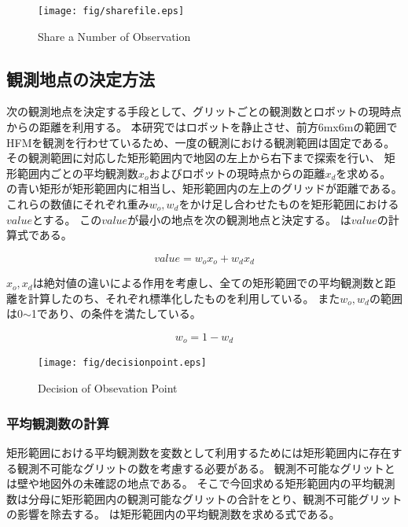 \documentclass{jsarticle}
\begin{document}
\begin{figure}[tbh]
 \centering
  \texttt{[image: fig/sharefile.eps]}
  \vspace*{-4mm}
  \caption{Share a Number of Observation}
  \label{fig: sharefile}
\end{figure}


\subsection{観測地点の決定方法}
\label{decide}
次の観測地点を決定する手段として、グリットごとの観測数とロボットの現時点からの距離を利用する。
本研究ではロボットを静止させ、前方6mx6mの範囲でHFMを観測を行わせているため、一度の観測における観測範囲は固定である。
その観測範囲に対応した矩形範囲内で地図の左上から右下まで探索を行い、
矩形範囲内ごとの平均観測数$x_{o}$およびロボットの現時点からの距離$x_{d}$を求める。
の青い矩形が矩形範囲内に相当し、矩形範囲内の左上のグリッドが距離である。
これらの数値にそれぞれ重み$w_{o},w_{d}$をかけ足し合わせたものを矩形範囲における$value$とする。
この$value$が最小の地点を次の観測地点と決定する。
は$value$の計算式である。

\begin{equation}
  value = w_{o}x_{o} + w_{d}x_{d}
	\label{eqn: value}
\end{equation}

$x_o,x_d$は絶対値の違いによる作用を考慮し、全ての矩形範囲での平均観測数と距離を計算したのち、それぞれ標準化したものを利用している。
また$w_o,w_d$の範囲は0$\sim$1であり、の条件を満たしている。

\begin{equation}
  w_o = 1 - w_d
	\label{eqn: weight}
\end{equation}


\begin{figure}[tbh]
 \centering
  \texttt{[image: fig/decisionpoint.eps]}
  \vspace*{-4mm}
  \caption{Decision of Obsevation Point}
  \label{fig: value-method}
\end{figure}

\subsubsection{平均観測数の計算}
矩形範囲における平均観測数を変数として利用するためには矩形範囲内に存在する観測不可能なグリットの数を考慮する必要がある。
観測不可能なグリットとは壁や地図外の未確認の地点である。
そこで今回求める矩形範囲内の平均観測数は分母に矩形範囲内の観測可能なグリットの合計をとり、観測不可能グリットの影響を除去する。
は矩形範囲内の平均観測数を求める式である。
\end{document}
